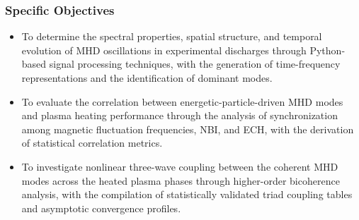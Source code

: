 \subsubsection{Specific Objectives}
\begin{itemize}
    \item To determine the spectral properties, spatial structure, and temporal evolution of MHD oscillations in experimental discharges through Python-based signal processing techniques, with the generation of time-frequency representations and the identification of dominant modes.
    
    \item To evaluate the correlation between energetic-particle-driven MHD modes and plasma heating performance through the analysis of synchronization among magnetic fluctuation frequencies, NBI, and ECH, with the derivation of statistical correlation metrics.
    
    \item To investigate nonlinear three-wave coupling between the coherent MHD modes across the heated plasma phases through higher-order bicoherence analysis, with the compilation of statistically validated triad coupling tables and asymptotic convergence profiles.
\end{itemize}